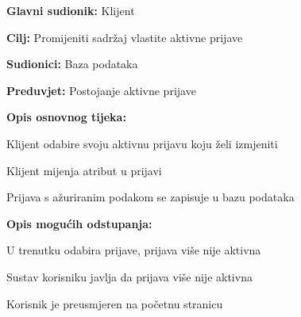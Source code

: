 					\noindent {}
					\begin{packed_item}
	
						\item \textbf{Glavni sudionik: }Klijent
						\item  \textbf{Cilj:} Promijeniti sadržaj vlastite aktivne prijave
						\item  \textbf{Sudionici:} Baza podataka
						\item  \textbf{Preduvjet:} Postojanje aktivne prijave
						\item  \textbf{Opis osnovnog tijeka:}
						
						\item[] \begin{packed_enum}
	
							\item Klijent odabire svoju aktivnu prijavu koju želi izmjeniti
							\item Klijent mijenja atribut u prijavi
							\item Prijava s ažuriranim podakom se zapisuje u bazu podataka
						\end{packed_enum}
						
						\item  \textbf{Opis mogućih odstupanja:}
						
						\item[] \begin{packed_item}
	
							\item[1.a] U trenutku odabira prijave, prijava više nije aktivna
							\item[] \begin{packed_enum}
								
								\item Sustav korisniku javlja da prijava više nije aktivna	
								\item Korisnik je preusmjeren na početnu stranicu
							\end{packed_enum}
						\end{packed_item}
					\end{packed_item}
					
